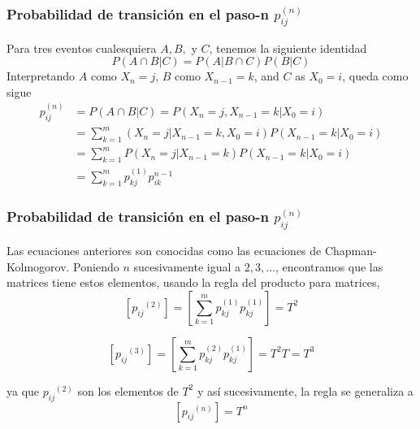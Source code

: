 \documentclass[spanish]{beamer}
\begin{document}

\begin{frame}
\frametitle{Probabilidad de transición en el paso-n $p_{ij}^{(n)}$}
Para tres eventos cualesquiera $A,B,$ y $C$, tenemos la siguiente identidad 
\begin{equation*}
P(A \cap B \vert C) = P(A \vert B \cap C) P(B \vert C) 
\end{equation*} 
Interpretando $A$ como $X_n = j$, $B$ como $X_{n-1} = k$, and $C$ as $X_{0} = i$, queda como sigue 
\small
\begin{align*} 
p_{ij}^{(n)}& = P(A \cap B \vert C) = P(X_{n}=j, X_{n-1}=k \vert X_{0}=i) \\
& =\sum_{k=1}^{m}
(X_{n}=j\vert X_{n-1}=k,  X_{0}=i) P(X_{n-1}=k \vert X_{0}=i)\\
& =\sum_{k=1}^{m}P(X_{n}=j\vert X_{n-1}=k) P(X_{n-1}=k \vert X_{0}=i)\\
& =\sum_{k=1}^{m} p_{kj}^{(1)}p_{ik}^{n-1}
\end{align*}

\end{frame}


\begin{frame}
\frametitle{Probabilidad de transición en el paso-n $p_{ij}^{(n)}$}
Las ecuaciones anteriores son conocidas como las ecuaciones de  Chapman-Kolmogorov. Poniendo $n$ sucesivamente igual a $2, 3, \ldots$, encontramos que las matrices tiene estos elementos, usando la regla del producto para matrices, 
\begin{equation*}
\left[ {p_{ij}}^{(2)} \right] = \left[ \sum_{k=1}^{m} p_{kj}^{(1)}p_{kj}^{(1)} \right] =  T^2
\end{equation*} 

\begin{equation*}
\left[ {p_{ij}}^{(3)} \right] = \left[ \sum_{k=1}^{m} p_{kj}^{(2)}p_{kj}^{(1)} \right] =  T^2T=T^3
\end{equation*}

ya que ${p_{ij}}^{(2)} $ son los elementos de $T^2$ y así sucesivamente, la regla se generaliza a 
\begin{equation*}
\left[ {p_{ij}}^{(n)} \right]=T^n
\end{equation*}
\end{frame}
\end{document}
